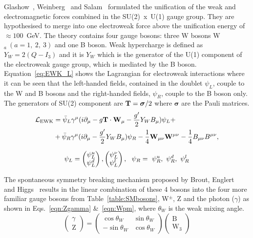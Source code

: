 Glashow~\cite{Glashow:1961tr}, Weinberg~\cite{PhysRevLett.19.1264} and Salam~\cite{Salam:1968rm} formulated the unification of the weak and electromagnetic forces combined in the SU(2)~x~U(1) gauge group. They are hypothesised to merge into one electroweak force above the unification energy of $\approx 100$~GeV. The theory contains four gauge bosons: three W bosons W$_{a}~(a=1,~2,~3)$ and one B boson. Weak hypercharge is defined as $Y_{W} = 2(Q-I_{3})$ and it is $Y_W$ which is the generator of the U(1) component of the electroweak gauge group, which is mediated by the B boson. Equation~\ref{eq:EWK_L} shows the Lagrangian for electroweak interactions where it can be seen that the left-handed fields, contained in the doublet $\psi_{L}$, couple to the W and B bosons and the right-handed fields, $\psi_{R}$, couple to the B boson only. The generators of SU(2) component are ${\bf T} = \boldsymbol{\sigma}/2$ where $\boldsymbol{\sigma}$ are the Pauli matrices.
\begin{equation}
\label{eq:EWK_L}
\begin{split}
\mathcal{L}_\textrm{EWK} & = \bar{\psi}_L \gamma^\mu ( i\partial_\mu  - g \mathbf{T} \cdot \mathbf{W}_\mu - \frac{g'}{2} Y_{W}
B_\mu) \psi_L + \\ & + \bar{\psi}_R \gamma^\mu (i \partial_\mu - \frac{g'}{2} Y_{W} B_\mu) \psi_R -
\frac{1}{4}\mathbf{W}_{\mu\nu} \mathbf{W}^{\mu\nu} -\frac{1}{4}B_{\mu\nu} B^{\mu\nu},
\end{split}
\end{equation}

\begin{equation*}
\psi_L = \begin{pmatrix} \psi^u_L \\ \psi^d_L \end{pmatrix}, \begin{pmatrix} \psi^\nu_L \\ \psi^l_L \end{pmatrix},~~\psi_R=~\psi_R^u,~\psi_R^d,~\psi_R^l
\end{equation*}

The spontaneous symmetry breaking mechanism proposed by Brout, Englert~\cite{PhysRevLett.13.321} and Higgs~\cite{PhysRevLett.13.508} results in the linear combination of these 4 bosons into the four more familiar gauge bosons from Table~\ref{table:SMbosons}, W$^{\pm}$, Z and the photon ($\gamma$) as shown in Eqs.~\ref{eqn:Zgamma} \&~\ref{eqn:Wpm}, where $\theta_{W}$ is the weak mixing angle.
\begin{equation}
\label{eqn:Zgamma}
{\begin{pmatrix}
\gamma \\
\textrm{Z} 
\end{pmatrix}}
=
{\begin{pmatrix}
\cos\theta_{W} & \sin\theta_{W} \\
-\sin\theta_{W} & \cos\theta_{W} 
\end{pmatrix}}
{\begin{pmatrix}
\textrm {B} \\
\textrm{W}_{3}
\end{pmatrix}}
\end{equation}

